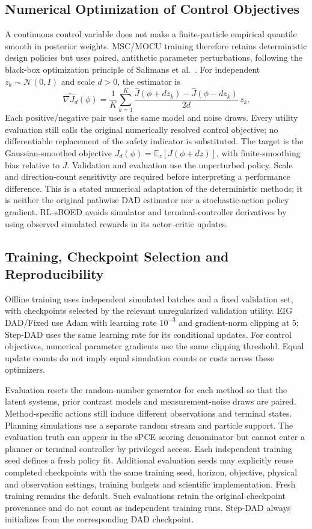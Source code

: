 \documentclass[journal]{IEEEtran}
\newcommand{\E}{\mathbb{E}}
\begin{document}
\subsection{Numerical Optimization of Control Objectives}
A continuous control variable does not make a finite-particle empirical
quantile smooth in posterior weights. MSC/MOCU training therefore retains
deterministic design policies but uses paired, antithetic parameter
perturbations, following the black-box optimization principle of
Salimans et al.~\cite{salimans2017es}. For independent
$z_k\sim\mathcal N(0,I)$ and scale $d>0$, the estimator is
\begin{equation}
\widehat{\nabla J_d}(\phi)=\frac1K\sum_{k=1}^K
\frac{\widehat J(\phi+d z_k)-\widehat J(\phi-d z_k)}{2d}\,z_k.
\label{eq:numerical-gradient}
\end{equation}
Each positive/negative pair uses the same model and noise draws. Every utility
evaluation still calls the original numerically resolved control objective;
no differentiable replacement of the safety indicator is substituted.
The target is the Gaussian-smoothed objective
$J_d(\phi)=\E_z[J(\phi+dz)]$, with finite-smoothing bias relative to $J$.
Validation and evaluation use the unperturbed policy. Scale and direction-count
sensitivity are required before interpreting a performance difference.
This is a stated numerical adaptation of the deterministic methods; it is
neither the original pathwise DAD estimator nor a stochastic-action policy
gradient. RL-sBOED avoids simulator and terminal-controller derivatives by
using observed simulated rewards in its actor--critic updates.

\subsection{Training, Checkpoint Selection and Reproducibility}
Offline training uses independent simulated batches and a fixed validation
set, with checkpoints selected by the relevant unregularized validation
utility. EIG DAD/Fixed use Adam with learning rate $10^{-3}$ and gradient-norm
clipping at 5; Step-DAD uses the same learning rate for its conditional updates.
For control objectives, numerical parameter gradients use the same clipping
threshold. Equal update counts do not imply equal simulation counts or costs
across these optimizers.

Evaluation resets the random-number generator for each method so that the
latent systems, prior contrast models and measurement-noise draws are paired.
Method-specific actions still induce different observations and terminal
states. Planning simulations use a separate random stream and particle support.
The evaluation truth can appear in the sPCE scoring denominator but cannot
enter a planner or terminal controller by privileged access. Each independent
training seed defines a fresh policy fit. Additional evaluation seeds may
explicitly reuse completed checkpoints with the same training seed, horizon,
objective, physical and observation settings, training budgets and scientific
implementation. Fresh training remains the default. Such evaluations retain
the original checkpoint provenance and do not count as independent training
runs. Step-DAD always initializes from the corresponding DAD checkpoint.
\end{document}
